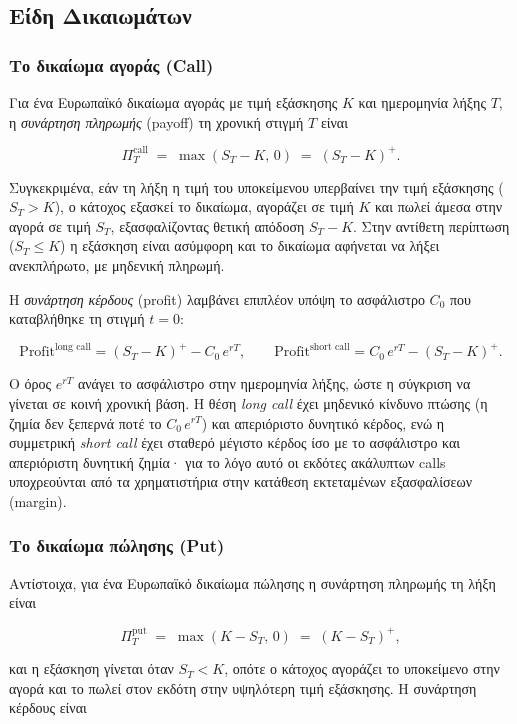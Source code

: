 \documentclass[12pt]{article}
\begin{document}
\subsection{Είδη Δικαιωμάτων}

\subsubsection{Το δικαίωμα αγοράς (Call)}

Για ένα Ευρωπαϊκό δικαίωμα αγοράς με τιμή εξάσκησης $K$ και ημερομηνία λήξης $T$, η \emph{συνάρτηση πληρωμής} (payoff) τη χρονική στιγμή $T$ είναι

$$
\Pi^{\text{call}}_T \;=\; \max(S_T - K,\, 0) \;=\; (S_T - K)^+ .
$$

Συγκεκριμένα, εάν τη λήξη η τιμή του υποκείμενου υπερβαίνει την τιμή εξάσκησης ($S_T > K$), ο κάτοχος εξασκεί το δικαίωμα, αγοράζει σε τιμή $K$ και πωλεί άμεσα στην αγορά σε τιμή $S_T$, εξασφαλίζοντας θετική απόδοση $S_T - K$. Στην αντίθετη περίπτωση ($S_T \leq K$) η εξάσκηση είναι ασύμφορη και το δικαίωμα αφήνεται να λήξει ανεκπλήρωτο, με μηδενική πληρωμή.

Η \emph{συνάρτηση κέρδους} (profit) λαμβάνει επιπλέον υπόψη το ασφάλιστρο $C_0$ που καταβλήθηκε τη στιγμή $t = 0$:

$$
\text{Profit}^{\text{long call}} = (S_T - K)^+ - C_0\,e^{rT}, \qquad
\text{Profit}^{\text{short call}} = C_0\,e^{rT} - (S_T - K)^+ .
$$

Ο όρος $e^{rT}$ ανάγει το ασφάλιστρο στην ημερομηνία λήξης, ώστε η σύγκριση να γίνεται σε κοινή χρονική βάση. Η θέση \emph{long call} έχει μηδενικό κίνδυνο πτώσης (η ζημία δεν ξεπερνά ποτέ το $C_0\,e^{rT}$) και απεριόριστο δυνητικό κέρδος, ενώ η συμμετρική \emph{short call} έχει σταθερό μέγιστο κέρδος ίσο με το ασφάλιστρο και απεριόριστη δυνητική ζημία· για το λόγο αυτό οι εκδότες ακάλυπτων calls υποχρεούνται από τα χρηματιστήρια στην κατάθεση εκτεταμένων εξασφαλίσεων (margin).

\subsubsection{Το δικαίωμα πώλησης (Put)}

Αντίστοιχα, για ένα Ευρωπαϊκό δικαίωμα πώλησης η συνάρτηση πληρωμής τη λήξη είναι

$$
\Pi^{\text{put}}_T \;=\; \max(K - S_T,\, 0) \;=\; (K - S_T)^+ ,
$$

και η εξάσκηση γίνεται όταν $S_T < K$, οπότε ο κάτοχος αγοράζει το υποκείμενο στην αγορά και το πωλεί στον εκδότη στην υψηλότερη τιμή εξάσκησης. Η συνάρτηση κέρδους είναι
\end{document}
